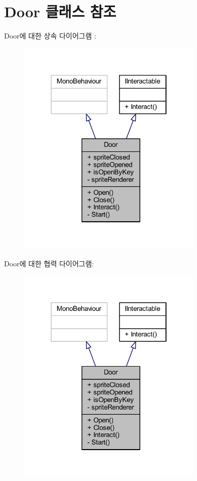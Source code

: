 \hypertarget{class_door}{}\section{Door 클래스 참조}
\label{class_door}


Door에 대한 상속 다이어그램 \+: \nopagebreak
\begin{figure}[H]
\begin{center}
\leavevmode
\includegraphics[width=250pt]{d0/d5d/class_door__inherit__graph}
\end{center}
\end{figure}


Door에 대한 협력 다이어그램\+:\nopagebreak
\begin{figure}[H]
\begin{center}
\leavevmode
\includegraphics[width=250pt]{dc/ddf/class_door__coll__graph}
\end{center}
\end{figure}
